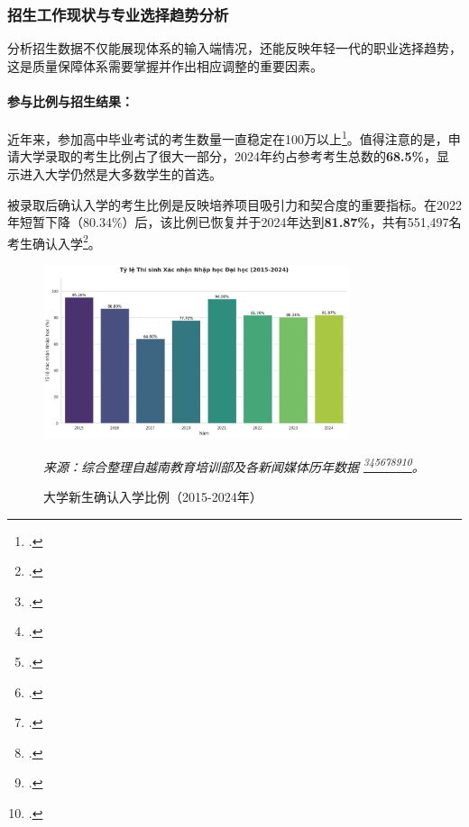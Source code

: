 \subsubsection{招生工作现状与专业选择趋势分析}

分析招生数据不仅能展现体系的输入端情况，还能反映年轻一代的职业选择趋势，这是质量保障体系需要掌握并作出相应调整的重要因素。

\paragraph{参与比例与招生结果：}
近年来，参加高中毕业考试的考生数量一直稳定在100万以上\footcite{stat_thi_sinh_2024}。值得注意的是，申请大学录取的考生比例占了很大一部分，2024年约占参考考生总数的\textbf{68.5\%}，显示进入大学仍然是大多数学生的首选。

被录取后确认入学的考生比例是反映培养项目吸引力和契合度的重要指标。在2022年短暂下降（80.34\%）后，该比例已恢复并于2024年达到\textbf{81.87\%}，共有551,497名考生确认入学\footcite{stat_nhap_hoc_2024}。

\begin{figure}[h!]
    \centering
    \includegraphics[width=0.8\textwidth]{image/ty_le_nhap_hoc_2015-2024.png}
    
    \caption{大学新生确认入学比例（2015-2024年）}
    \label{fig:ty_le_nhap_hoc_full}
    \vspace{0.2cm}
    
    \footnotesize{\textit{来源：综合整理自越南教育培训部及各新闻媒体历年数据 
    \footcite{ref1}\footcite{ref2}\footcite{ref3}\footcite{ref5}\footcite{ref7}\footcite{ref12}\footcite{ref19}\footcite{stat_nhap_hoc_2024}。}}
\end{figure}


